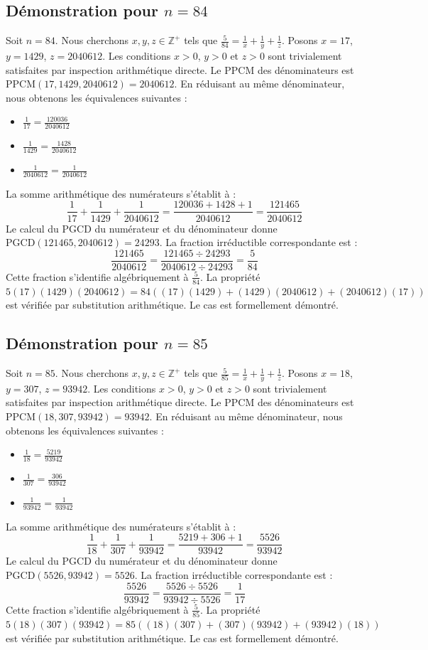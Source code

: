\documentclass[12pt,a4paper]{article}
\begin{document}
\subsection{Démonstration pour $n = 84$}
Soit $n = 84$. Nous cherchons $x, y, z \in \mathbb{Z}^{+}$ tels que $\frac{5}{84} = \frac{1}{x} + \frac{1}{y} + \frac{1}{z}$.
Posons $x = 17$, $y = 1429$, $z = 2040612$.
Les conditions $x > 0$, $y > 0$ et $z > 0$ sont trivialement satisfaites par inspection arithmétique directe.
Le PPCM des dénominateurs est $\text{PPCM}(17, 1429, 2040612) = 2040612$.
En réduisant au même dénominateur, nous obtenons les équivalences suivantes :
\begin{itemize}
    \item $\frac{1}{17} = \frac{120036}{2040612}$
    \item $\frac{1}{1429} = \frac{1428}{2040612}$
    \item $\frac{1}{2040612} = \frac{1}{2040612}$
\end{itemize}
La somme arithmétique des numérateurs s'établit à :
$$ \frac{1}{17} + \frac{1}{1429} + \frac{1}{2040612} = \frac{120036 + 1428 + 1}{2040612} = \frac{121465}{2040612} $$
Le calcul du PGCD du numérateur et du dénominateur donne $\text{PGCD}(121465, 2040612) = 24293$.
La fraction irréductible correspondante est :
$$ \frac{121465}{2040612} = \frac{121465 \div 24293}{2040612 \div 24293} = \frac{5}{84} $$
Cette fraction s'identifie algébriquement à $\frac{5}{84}$.
La propriété $5(17)(1429)(2040612) = 84((17)(1429) + (1429)(2040612) + (2040612)(17))$ est vérifiée par substitution arithmétique.
Le cas est formellement démontré.

\subsection{Démonstration pour $n = 85$}
Soit $n = 85$. Nous cherchons $x, y, z \in \mathbb{Z}^{+}$ tels que $\frac{5}{85} = \frac{1}{x} + \frac{1}{y} + \frac{1}{z}$.
Posons $x = 18$, $y = 307$, $z = 93942$.
Les conditions $x > 0$, $y > 0$ et $z > 0$ sont trivialement satisfaites par inspection arithmétique directe.
Le PPCM des dénominateurs est $\text{PPCM}(18, 307, 93942) = 93942$.
En réduisant au même dénominateur, nous obtenons les équivalences suivantes :
\begin{itemize}
    \item $\frac{1}{18} = \frac{5219}{93942}$
    \item $\frac{1}{307} = \frac{306}{93942}$
    \item $\frac{1}{93942} = \frac{1}{93942}$
\end{itemize}
La somme arithmétique des numérateurs s'établit à :
$$ \frac{1}{18} + \frac{1}{307} + \frac{1}{93942} = \frac{5219 + 306 + 1}{93942} = \frac{5526}{93942} $$
Le calcul du PGCD du numérateur et du dénominateur donne $\text{PGCD}(5526, 93942) = 5526$.
La fraction irréductible correspondante est :
$$ \frac{5526}{93942} = \frac{5526 \div 5526}{93942 \div 5526} = \frac{1}{17} $$
Cette fraction s'identifie algébriquement à $\frac{5}{85}$.
La propriété $5(18)(307)(93942) = 85((18)(307) + (307)(93942) + (93942)(18))$ est vérifiée par substitution arithmétique.
Le cas est formellement démontré.
\end{document}

